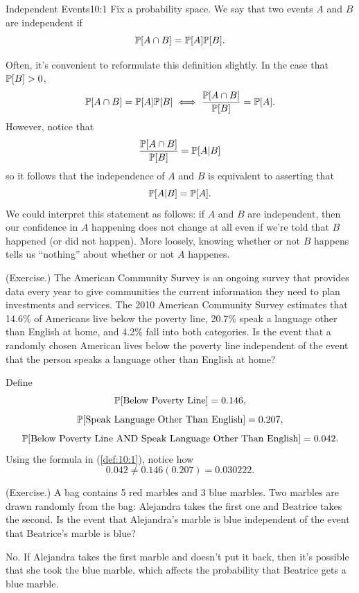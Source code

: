 \documentclass[letterpaper]{article}
\begin{document}
\begin{definition}{Independent Events}{10:1}
    Fix a probability space. We say that two events $A$ and $B$ are independent if 
    \[\mathbb{P}[A \cap B] = \mathbb{P}[A]\mathbb{P}[B].\]
\end{definition}
Often, it's convenient to reformulate this definition slightly. In the case that $\mathbb{P}[B] > 0$, \[\mathbb{P}[A \cap B] = \mathbb{P}[A] \mathbb{P}[B] \iff \frac{\mathbb{P}[A \cap B]}{\mathbb{P}[B]} = \mathbb{P}[A].\] However, notice that \[\frac{\mathbb{P}[A \cap B]}{\mathbb{P}[B]} = \mathbb{P}[A | B]\] so it follows that the independence of $A$ and $B$ is equivalent to asserting that \[\mathbb{P}[A | B] = \mathbb{P}[A].\] We could interpret this statement as follows: if $A$ and $B$ are independent, then our confidence in $A$ happening does not change at all even if we're told that $B$ happened (or did not happen). More loosely, knowing whether or not $B$ happens tells us ``nothing'' about whether or not $A$ happenes.

\begin{mdframed}
    (Exercise.) The American Community Survey is an ongoing survey that provides data every year to give communities the current information they need to plan investments and services. The 2010 American Community Survey estimates that 14.6\% of Americans live below the poverty line, 20.7\% speak a language other than English at home, and 4.2\% fall into both categories. Is the event that a randomly chosen American lives below the poverty line independent of the event that the person speaks a language other than English at home?

    \begin{mdframed}
        Define 
        \[\mathbb{P}[\text{Below Poverty Line}] = 0.146,\]
        \[\mathbb{P}[\text{Speak Language Other Than English}] = 0.207,\]
        \[\mathbb{P}[\text{Below Poverty Line AND Speak Language Other Than English}] = 0.042.\]
        Using the formula in (\ref{def:10:1}), notice how \[0.042 \neq 0.146(0.207) = 0.030222.\]
    \end{mdframed}
\end{mdframed}

\begin{mdframed}
    (Exercise.) A bag contains 5 red marbles and 3 blue marbles. Two marbles are drawn randomly from the bag: Alejandra takes the first one and Beatrice takes the second. Is the event that Alejandra's marble is blue independent of the event that Beatrice's marble is blue?

    \begin{mdframed}
        No. If Alejandra takes the first marble and doesn't put it back, then it's possible that she took the blue marble, which affects the probability that Beatrice gets a blue marble.
    \end{mdframed}
\end{mdframed}
\end{document}
